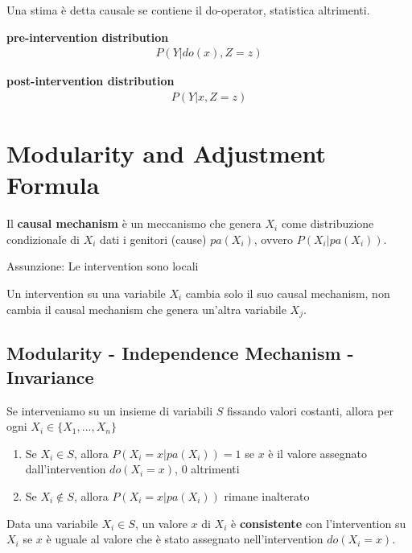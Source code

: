 Una stima è detta causale se contiene il do-operator, statistica altrimenti.

\bigskip
\begin{center}
  \begin{minipage}{0.475\linewidth}
    \centering
    \textbf{pre-intervention distribution}
    \begin{align*}
      P(Y | do(x), Z = z)
    \end{align*}
  \end{minipage}
  \begin{minipage}{0.475\linewidth}
    \centering
    \textbf{post-intervention distribution}
    \begin{align*}
      P(Y | x, Z = z)
    \end{align*}
  \end{minipage}
\end{center}
\bigskip

\section{Modularity and Adjustment Formula}
Il \textbf{causal mechanism} è un meccanismo che genera $X_i$ come distribuzione condizionale di $X_i$ dati i genitori (cause) $pa(X_i)$, ovvero $P(X_i | pa(X_i))$.

Assunzione: Le intervention sono locali

Un intervention su una variabile $X_i$ cambia solo il suo causal mechanism, non cambia il causal mechanism che genera un'altra variabile $X_j$.

\subsection*{Modularity - Independence Mechanism - Invariance}
Se interveniamo su un insieme di variabili $S$ fissando valori costanti,
allora per ogni $X_i \in \{X_1, ..., X_n\}$
\begin{enumerate}
  \item Se $X_i \in S$, allora $P(X_i = x| pa(X_i)) = 1$ se $x$ è il valore assegnato dall'intervention $do(X_i=x)$, 0 altrimenti
  \item Se $X_i \not\in S$, allora $P(X_i = x | pa(X_i))$ rimane inalterato
\end{enumerate}

Data una variabile $X_i \in S$, un valore $x$ di $X_i$ è \textbf{consistente} con l'intervention su $X_i$ se $x$ è uguale al valore che è stato assegnato nell'intervention $do(X_i=x)$.

